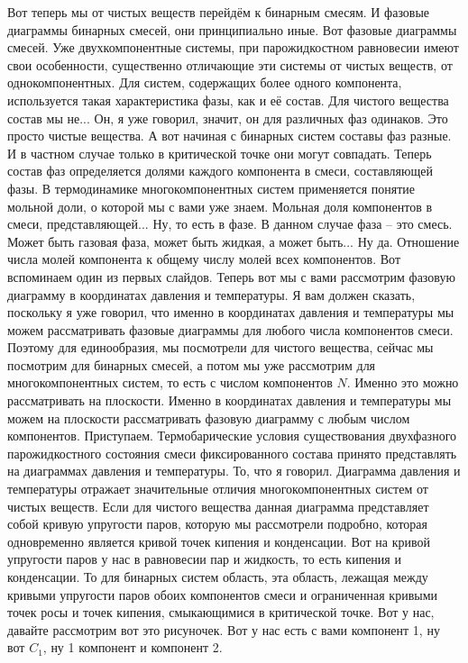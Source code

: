 \documentclass[main.tex]{subfiles}
\begin{document}
Вот теперь мы от чистых веществ перейдём к бинарным смесям.
И фазовые диаграммы бинарных смесей, они принципиально иные.
Вот фазовые диаграммы смесей.
Уже двухкомпонентные системы, при парожидкостном равновесии имеют свои особенности, существенно отличающие эти системы от чистых веществ, от однокомпонентных.
Для систем, содержащих более одного компонента, используется такая характеристика фазы, как и её состав.
Для чистого вещества состав мы не...
Он, я уже говорил, значит, он для различных фаз одинаков.
Это просто чистые вещества.
А вот начиная с бинарных систем составы фаз разные.
И в частном случае только в критической точке они могут совпадать.
Теперь состав фаз определяется долями каждого компонента в смеси, составляющей фазы.
В термодинамике многокомпонентных систем применяется понятие мольной доли, о которой мы с вами уже знаем.
Мольная доля компонентов в смеси, представляющей...
Ну, то есть в фазе.
В данном случае фаза -- это смесь.
Может быть газовая фаза, может быть жидкая, а может быть...
Ну да.
Отношение числа молей компонента к общему числу молей всех компонентов.
Вот вспоминаем один из первых слайдов.
Теперь вот мы с вами рассмотрим фазовую диаграмму в координатах давления и температуры.
Я вам должен сказать, поскольку я уже говорил, что именно в координатах давления и температуры мы можем рассматривать фазовые диаграммы для любого числа компонентов смеси.
Поэтому для единообразия, мы посмотрели для чистого вещества, сейчас мы посмотрим для бинарных смесей, а потом мы уже рассмотрим для многокомпонентных систем, то есть с числом компонентов $N$.
Именно это можно рассматривать на плоскости.
Именно в координатах давления и температуры мы можем на плоскости рассматривать фазовую диаграмму с любым числом компонентов.
Приступаем.
Термобарические условия существования двухфазного парожидкостного состояния смеси фиксированного состава принято представлять на диаграммах давления и температуры.
То, что я говорил.
Диаграмма давления и температуры отражает значительные отличия многокомпонентных систем от чистых веществ.
Если для чистого вещества данная диаграмма представляет собой кривую упругости паров, которую мы рассмотрели подробно, которая одновременно является кривой точек кипения и конденсации.
Вот на кривой упругости паров у нас в равновесии пар и жидкость, то есть кипения и конденсации.
То для бинарных систем область, эта область, лежащая между кривыми упругости паров обоих компонентов смеси и ограниченная кривыми точек росы и точек кипения, смыкающимися в критической точке.
Вот у нас, давайте рассмотрим вот это рисуночек.
Вот у нас есть с вами компонент 1, ну вот $C_1$, ну 1 компонент и компонент 2.
\end{document}
